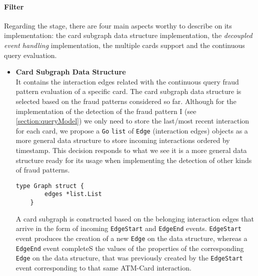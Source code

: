 \paragraph*{Filter\\}

Regarding the \filter stage, there are four main aspects worthy to describe on its implementation: the card subgraph data structure implementation, the \emph{decoupled event handling} implementation, the \filter multiple cards support and the continuous query evaluation.
\begin{itemize}
    \item \textbf{Card Subgraph Data Structure}\\
    It contains the interaction edges related with the continuous query fraud pattern evaluation of a specific card.
    The card subgraph data structure is selected based on the fraud patterns considered so far. Although for the implementation of the detection of the fraud pattern I (see \ref{section:queryModel}) we only need to store the last/most recent interaction for each card, we propose a \texttt{Go} \texttt{list} of \texttt{Edge} (interaction edges) objects as a more general data structure to store incoming interactions ordered by timestamp. This decision responds to what we see it is a more general data structure ready for its usage when implementing the detection of other kinds of fraud patterns.\\ 

    \begin{center}
    \lstset{style=golangStyle}
    \begin{lstlisting}[caption={Card Subgraph Data Structure in Go}]
    type Graph struct {
    	edges *list.List 
    }
    \end{lstlisting}
    \end{center}

    A card subgraph is constructed based on the belonging interaction edges that arrive in the form of incoming \texttt{EdgeStart} and \texttt{EdgeEnd} events. \texttt{EdgeStart} event  produces the creation of a new \texttt{Edge} on the data structure, whereas a \texttt{EdgeEnd} event completeS the values of the properties of the corresponding \texttt{Edge} on the data structure, that was previously created by the \texttt{EdgeStart} event corresponding to that same ATM-Card interaction.


\end{itemize}
